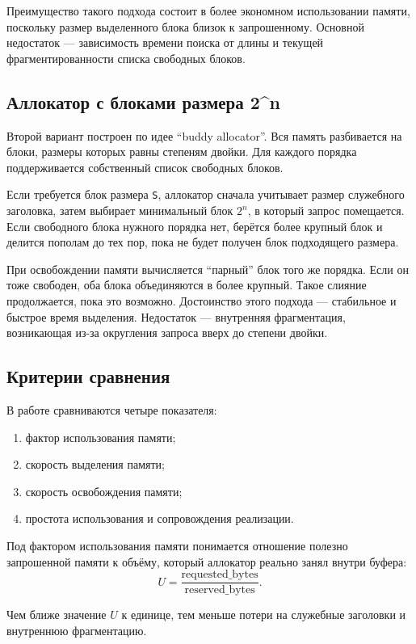 \documentclass[unicode, 12pt, a4paper, oneside, fleqn]{article}
\newcommand{\powertwoname}{2\textasciicircum{}n}
\begin{document}
Преимущество такого подхода состоит в более экономном использовании памяти, поскольку размер выделенного блока близок к запрошенному. Основной недостаток --- зависимость времени поиска от длины и текущей фрагментированности списка свободных блоков.

\subsection{Аллокатор с блоками размера \powertwoname}

Второй вариант построен по идее \enquote{buddy allocator}. Вся память разбивается на блоки, размеры которых равны степеням двойки. Для каждого порядка поддерживается собственный список свободных блоков.

Если требуется блок размера \texttt{S}, аллокатор сначала учитывает размер служебного заголовка, затем выбирает минимальный блок $2^n$, в который запрос помещается. Если свободного блока нужного порядка нет, берётся более крупный блок и делится пополам до тех пор, пока не будет получен блок подходящего размера.

При освобождении памяти вычисляется \enquote{парный} блок того же порядка. Если он тоже свободен, оба блока объединяются в более крупный. Такое слияние продолжается, пока это возможно. Достоинство этого подхода --- стабильное и быстрое время выделения. Недостаток --- внутренняя фрагментация, возникающая из-за округления запроса вверх до степени двойки.

\subsection{Критерии сравнения}

В работе сравниваются четыре показателя:
\begin{enumerate}[leftmargin=1.5cm]
\item фактор использования памяти;
\item скорость выделения памяти;
\item скорость освобождения памяти;
\item простота использования и сопровождения реализации.
\end{enumerate}

Под фактором использования памяти понимается отношение полезно запрошенной памяти к объёму, который аллокатор реально занял внутри буфера:
\[
U = \frac{\text{requested\_bytes}}{\text{reserved\_bytes}}.
\]

Чем ближе значение $U$ к единице, тем меньше потери на служебные заголовки и внутреннюю фрагментацию.
\end{document}
